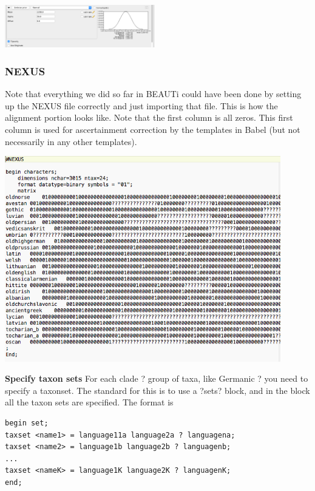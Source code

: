 \documentclass{article}
\begin{document}
\begin{center}
\includegraphics[width=0.49\textwidth]{umbrian2}
\end{center}

\subsubsection*{NEXUS}
Note that everything we did so far in BEAUTi could have been done by setting up the NEXUS file correctly and just importing that file.
This is how the alignment portion looks like. Note that the first column is all zeros. This first column is used for ascertainment correction by the templates in Babel (but not necessarily in any other templates).

\begin{center}
\includegraphics[width=0.9\textwidth]{nexus0}
\end{center}


{\bf Specify taxon sets}
For each clade ? group of taxa, like Germanic ? you need to specify a taxonset. The standard for this is to use a ?sets? block, and in the block all the taxon sets are specified. The format is 

\begin{verbatim}
begin set;
taxset <name1> = language11a language2a ? languagena;
taxset <name2> = language1b language2b ? languagenb;
... 
taxset <nameK> = language1K language2K ? languagenK;
end;
\end{verbatim}
\end{document}
